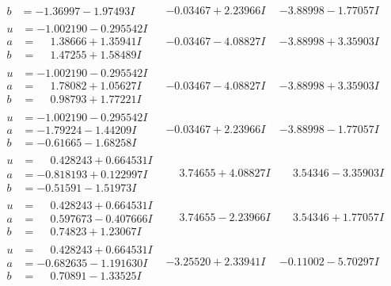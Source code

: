 \documentclass[1p]{elsarticle_modified}
\theoremstyle{definition}
\begin{document}
$$\begin{array}{c|c|c}
\begin{aligned}
b &= -1.36997 - 1.97493 I\end{aligned}
 & -0.03467 + 2.23966 I & -3.88998 - 1.77057 I \\ \hline\begin{aligned}
u &= -1.002190 - 0.295542 I \\
a &= \phantom{-}1.38666 + 1.35941 I \\
b &= \phantom{-}1.47255 + 1.58489 I\end{aligned}
 & -0.03467 - 4.08827 I & -3.88998 + 3.35903 I \\ \hline\begin{aligned}
u &= -1.002190 - 0.295542 I \\
a &= \phantom{-}1.78082 + 1.05627 I \\
b &= \phantom{-}0.98793 + 1.77221 I\end{aligned}
 & -0.03467 - 4.08827 I & -3.88998 + 3.35903 I \\ \hline\begin{aligned}
u &= -1.002190 - 0.295542 I \\
a &= -1.79224 - 1.44209 I \\
b &= -0.61665 - 1.68258 I\end{aligned}
 & -0.03467 + 2.23966 I & -3.88998 - 1.77057 I \\ \hline\begin{aligned}
u &= \phantom{-}0.428243 + 0.664531 I \\
a &= -0.818193 + 0.122997 I \\
b &= -0.51591 - 1.51973 I\end{aligned}
 & \phantom{-}3.74655 + 4.08827 I & \phantom{-}3.54346 - 3.35903 I \\ \hline\begin{aligned}
u &= \phantom{-}0.428243 + 0.664531 I \\
a &= \phantom{-}0.597673 - 0.407666 I \\
b &= \phantom{-}0.74823 + 1.23067 I\end{aligned}
 & \phantom{-}3.74655 - 2.23966 I & \phantom{-}3.54346 + 1.77057 I \\ \hline\begin{aligned}
u &= \phantom{-}0.428243 + 0.664531 I \\
a &= -0.682635 - 1.191630 I \\
b &= \phantom{-}0.70891 - 1.33525 I\end{aligned}
 & -3.25520 + 2.33941 I & -0.11002 - 5.70297 I \\ \hline\begin{aligned}

\end{aligned}
\end{array}$$
\end{document}

